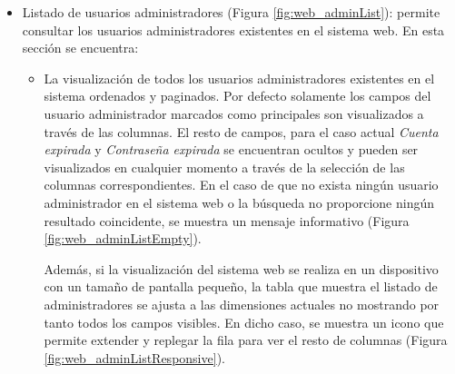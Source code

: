 \documentclass[12pt,a4paper, twoside]{report}
\begin{document}
	\begin{itemize}
		\item Listado de usuarios administradores (Figura \ref{fig:web_adminList}): permite consultar los usuarios administradores existentes en el sistema web. En esta sección se encuentra:
		
		
		\begin{itemize}
			\item La visualización de todos los usuarios administradores existentes en el sistema ordenados y paginados. Por defecto solamente los campos del usuario administrador marcados como principales son visualizados a través de las columnas. El resto de campos, para el caso actual \textit{Cuenta expirada} y \textit{Contraseña expirada} se encuentran ocultos y pueden ser visualizados en cualquier momento a través de la selección de las columnas correspondientes. En el caso de que no exista ningún usuario administrador en el sistema web o la búsqueda no proporcione ningún resultado coincidente, se muestra un mensaje informativo (Figura \ref{fig:web_adminListEmpty}).	
			
				
				Además, si la visualización del sistema web se realiza en un dispositivo con un tamaño de pantalla pequeño, la tabla que muestra el listado de administradores se ajusta a las dimensiones actuales no mostrando por tanto todos los campos visibles. En dicho caso, se muestra un icono que permite extender y replegar la fila para ver el resto de columnas (Figura \ref{fig:web_adminListResponsive}).
				


\end{itemize}
\end{itemize}
\end{document}
